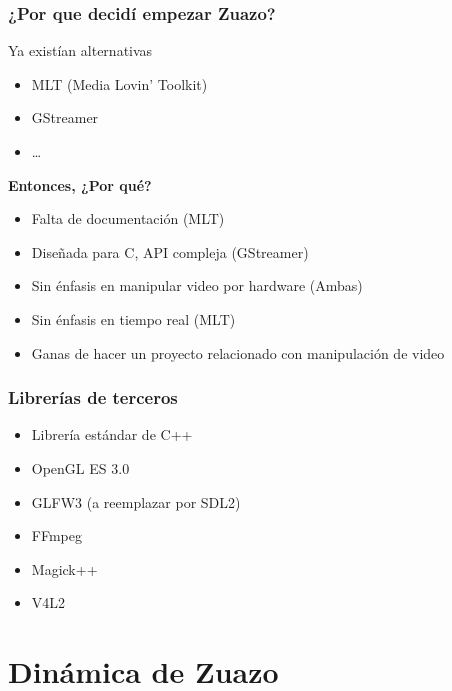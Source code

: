 \documentclass{beamer}
\begin{document}
\begin{frame} \frametitle{¿Por que decidí empezar Zuazo?}
	\begin{block}{Ya existían alternativas}
		\begin{itemize}
			\item{MLT (Media Lovin' Toolkit)}
			\item{GStreamer}
			\item{\ldots}
		\end{itemize}
	\end{block}
	\textbf{Entonces, ¿Por qué?}
	\begin{itemize}
		\item{Falta de documentación (MLT)}
		\item{Diseñada para C, API compleja (GStreamer)}
		\item{Sin énfasis en manipular video por hardware (Ambas)} 
		\item{Sin énfasis en tiempo real (MLT)} 
		\item{Ganas de hacer un proyecto relacionado con manipulación de video}
	\end{itemize}
\end{frame}

\begin{frame} \frametitle{Librerías de terceros}
	\begin{itemize}
		\item{Librería estándar de C++}
		\item{OpenGL ES 3.0}
		\item{GLFW3 (a reemplazar por SDL2)}
		\item{FFmpeg}
		\item{Magick++}
		\item{V4L2}
	\end{itemize}
\end{frame}


%
%
\section{Dinámica de Zuazo}
\end{document}

